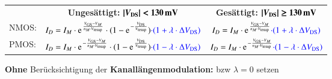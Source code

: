\resizebox{\columnwidth}{!}
{
    \renewcommand{\arraystretch}{1.5}
    \begin{tabular}{@{}l c | c@{}}
                & \textbf{Ungesättigt:} \quad $\bm{| V_{\rm DS} | < 130 \, \mathrm{mV}}$                                                                                                  & \textbf{Gesättigt:} \quad $\bm{| V_{\rm DS} | \geq 130 \, \mathrm{mV}}$                                                             \\
        NMOS:   & $I_D = I_M \cdot \e^{\frac{V_{\rm GS} - V_M}{n_M \cdot V_\text{temp}}} \cdot (1 - \e^{-\frac{V_{\rm DS}}{V_\text{temp}}}) \cbl{\cdot (1 + \lambda \cdot \Delta V_{\rm DS})}$  & $I_D = I_M \cdot \e^{\frac{V_{\rm GS} - V_M}{n_M \cdot V_\text{temp}}} \cbl{\cdot (1 + \lambda \cdot \Delta V_{\rm DS})}$     \\
        \midrule
        PMOS:   & $I_D = I_M \cdot \e^{- \frac{V_{\rm GS} - V_M}{n_M \cdot V_\text{temp}}} \cdot (1 - \e^{\frac{V_{\rm DS}}{V_\text{temp}}}) \cbl{\cdot (1 - \lambda \cdot \Delta V_{\rm DS})}$ & $I_D = I_M \cdot \e^{- \frac{V_{\rm GS} - V_M}{n_M \cdot V_\text{temp}}} \cbl{\cdot (1 - \lambda \cdot \Delta V_{\rm DS})}$   \\
    \end{tabular}
    \renewcommand{\arraystretch}{1}
}

\medskip

\textbf{Ohne} Berücksichtigung der \textbf{Kanallängenmodulation:}  bzw $\lambda = 0$ setzen







